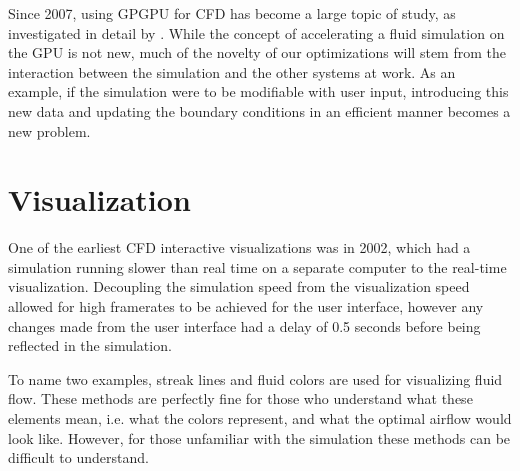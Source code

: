 Since 2007, using GPGPU for CFD has become a large topic of study, as investigated in detail by \cite{paper:GPGPUSummary:10.1007/s11227-013-1015-7}.
While the concept of accelerating a fluid simulation on the GPU is not new, much of the novelty of our optimizations will stem from the interaction between the simulation and the other systems at work.
As an example, if the simulation were to be modifiable with user input, introducing this new data and updating the boundary conditions in an efficient manner becomes a new problem.




\section{Visualization}
One of the earliest CFD interactive visualizations was in 2002, which had a simulation running slower than real time on a separate computer to the real-time visualization\cite{paper:2002vis:10.5555/509740.509745}.
Decoupling the simulation speed from the visualization speed allowed for high framerates to be achieved for the user interface, however any changes made from the user interface had a delay of 0.5 seconds before being reflected in the simulation.

To name two examples, streak lines and fluid colors are used for visualizing fluid flow\cite{video:AutodeskFlowDesign}.
These methods are perfectly fine for those who understand what these elements mean, i.e. what the colors represent, and what the optimal airflow would look like.
However, for those unfamiliar with the simulation these methods can be difficult to understand.

